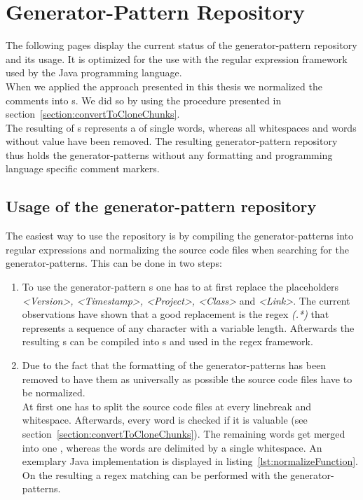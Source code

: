 
\chapter{Generator-Pattern Repository}\label{chapter:generatorPatternRepository}
The following pages display the current status of the generator-pattern repository and its usage. It is optimized for the use with the regular expression framework used by the Java programming language.\\
When we applied the approach presented in this thesis we normalized the comments into s. We did so by using the procedure presented in section~\ref{section:convertToCloneChunks}.\\
The resulting  of s represents a  of single words, whereas all whitespaces and words without value have been removed. The resulting generator-pattern repository thus holds the generator-patterns without any formatting and programming language specific comment markers.

\section{Usage of the generator-pattern repository}
The easiest way to use the repository is by compiling the generator-patterns into regular expressions and normalizing the source code files when searching for the generator-patterns. This can be done in two steps:

\begin{enumerate}
	\item To use the generator-pattern s one has to at first replace the placeholders \textit{<Version>, <Timestamp>, <Project>, <Class>} and \textit{<Link>}. The current observations have shown that a good replacement is the regex \textit{(.*)} that represents a sequence of any character with a variable length. Afterwards the resulting s can be compiled into s and used in the regex framework.
	\item Due to the fact that the formatting of the generator-patterns has been removed to have them as universally as possible the source code files have to be normalized. \\
	At first one has to split the source code files at every linebreak and whitespace. Afterwards, every word is checked if it is valuable (see section~\ref{section:convertToCloneChunks}). The remaining words get merged into one , whereas the words are delimited by a single whitespace. An exemplary Java implementation is displayed in listing~\ref{lst:normalizeFunction}.\\
	On the resulting   a regex matching can be performed with the generator-patterns.
\end{enumerate}



